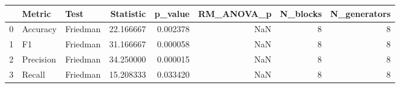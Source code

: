 \begin{tabular}{lllrrrrr}
\toprule
 & Metric & Test & Statistic & p_value & RM_ANOVA_p & N_blocks & N_generators \\
\midrule
0 & Accuracy & Friedman & 22.166667 & 0.002378 & NaN & 8 & 8 \\
1 & F1 & Friedman & 31.166667 & 0.000058 & NaN & 8 & 8 \\
2 & Precision & Friedman & 34.250000 & 0.000015 & NaN & 8 & 8 \\
3 & Recall & Friedman & 15.208333 & 0.033420 & NaN & 8 & 8 \\
\bottomrule
\end{tabular}
